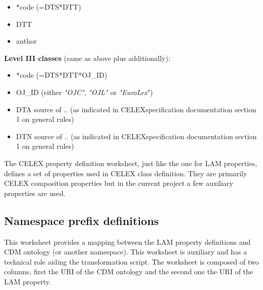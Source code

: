 \begin{itemize}

\item
  *code (=DTS*DTT)
\item
  DTT
\item
  author
\end{itemize}

\textbf{Level III classes} (same as above plus additionally):

\begin{itemize}

\item
  *code (=DTS*DTT*OJ\_ID)
\item
  OJ\_ID (either \emph{"OJC"}, \emph{"OJL"} or \emph{"EuroLex}")
\item
  DTA source of .. (as indicated in CELEXspecification documentation
  section 1 on general rules)
\item
  DTN source of .. (as indicated in CELEXspecification documentation
  section 1 on general rules)
\end{itemize}

The CELEX property definition worksheet, just like the one for LAM
properties, defines a set of properties used in CELEX class definition.
They are primarily CELEX composition properties but in the current project a few auxiliary properties are used.

\subsection{Namespace prefix definitions}
\label{sec:prefix-section}

This worksheet provides a mapping between the LAM property definitions
and CDM ontology (or another namespace). This worksheet is auxiliary and
has a technical role aiding the transformation script. The worksheet is
composed of two columns, first the URI of the CDM ontology and the
second one the URI of the LAM property.

